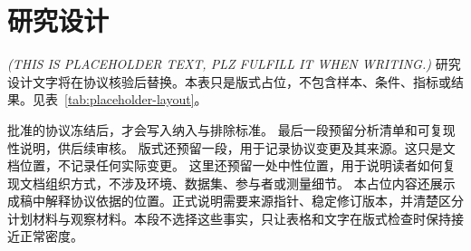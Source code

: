 \section{研究设计}\label{sec:study-design}
\textit{(THIS IS PLACEHOLDER TEXT, PLZ FULFILL IT WHEN WRITING.)}
研究设计文字将在协议核验后替换。本表只是版式占位，不包含样本、条件、指标或结果。见表~\ref{tab:placeholder-layout}。

批准的协议冻结后，才会写入纳入与排除标准。
最后一段预留分析清单和可复现性说明，供后续审核。
版式还预留一段，用于记录协议变更及其来源。这只是文档位置，不记录任何实际变更。
这里还预留一处中性位置，用于说明读者如何复现文档组织方式，不涉及环境、数据集、参与者或测量细节。
本占位内容还展示成稿中解释协议依据的位置。正式说明需要来源指针、稳定修订版本，并清楚区分计划材料与观察材料。本段不选择这些事实，只让表格和文字在版式检查时保持接近正常密度。
